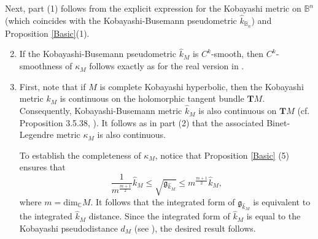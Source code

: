 \documentclass[a4paper,11pt,reqno]{amsart}
\theoremstyle{plain}
\theoremstyle{definition}
\theoremstyle{remark}
\theoremstyle{remark}
\numberwithin{equation}{section}
\newcommand{\g}{\mathfrak{g}}
\begin{document}
Next, part (1) follows from the explicit expression for the Kobayashi metric on $ \mathbb{B}^n $ (which coincides with the Kobayashi-Busemann pseudometric $ \hat{k}_{\mathbb{B}_n} $) and Proposition \ref{Basic}\;(1). 

\begin{enumerate} [wide] \setcounter{enumi}{1}
\item 


If the Kobayashi-Busemann pseudometric $ \hat{k}_M $ is $ C^k$-smooth, then $ C^k$-smoothness of $ \kappa_M $ follows exactly as for the real version in \cite[Theorem~2.4]{binet}. 


\item First, note that if $ M $ is complete Kobayashi hyperbolic, then the Kobayashi metric $ k_M $ is continuous on the holomorphic tangent bundle $ \textbf{T} M $. Consequently, Kobayashi-Busemann metric $ \hat{k}_M $ is also continuous on $ \textbf{T} M $ (cf. Proposition 3.5.38, \cite{kobayashifat}). It follows as in part (2) that the associated Binet-Legendre metric $ \kappa_M $ is also continuous. 

To establish the completeness of $ \kappa_M $, notice that 
Proposition \ref{Basic} (5) ensures that 
\[
\frac{1}{m^{\frac{m+1}{2}}} \hat{k}_M \leq \sqrt{\g_{\hat{k}_M}} \leq {m^{\frac{m+1}{2}}}{\hat{k}_M},  
\]
where $ m = \mbox{dim}_{\mathbb{C}} M $. It follows that the integrated form of $ \g_{\hat{k}_M}$ is equivalent to the integrated $ \hat{k}_M $ distance. Since the integrated form of $ \hat{k}_M $ is equal to the Kobayashi pseudodistance $ d_M $ (see \cite{Kobayashi2}), the desired result follows.
 


\end{enumerate}
\end{document}
